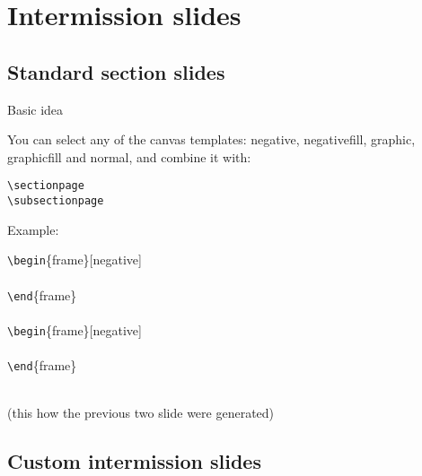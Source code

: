 \documentclass[aspectratio=1610]{beamer}
\newcommand*\command[1]{{\tt \textbackslash #1}}
\newcommand*\ind[1][2ex]{\hspace*{#1}}
\newcommand*\bframe[1][]{\command{begin}\{#1frame\}}
\newcommand*\eframe[1][]{\command{end}\{#1frame\}}
\begin{document}
\section{Intermission slides}

\begin{frame}[negative]
  \sectionpage
\end{frame}

\subsection{Standard section slides}

\begin{frame}[negative]
  \subsectionpage
\end{frame}

\begin{frame}[t]
  {Basic idea}

  You can select any of the canvas templates: negative, negativefill,
  graphic, graphicfill and normal, and combine it with:
  \begin{description}
  \item[\command{sectionpage}]
  \item[\command{subsectionpage}]
  \end{description}

  Example:\\[1ex]
  \begin{codesnippet}[0.8\textwidth]
    \bframe[][negative]\\
    \ind \command{sectionpage}\\
    \eframe\\~\\
    \bframe[][negative]\\
    \ind \command{subsectionpage}\\
    \eframe
  \end{codesnippet}\\[1ex]
  (this how the previous two slide were generated)
\end{frame}

\subsection{Custom intermission slides}

\begin{frame}[negative]
  \subsectionpage
\end{frame}
\end{document}
